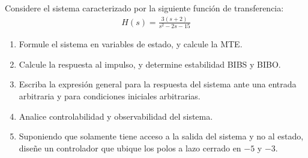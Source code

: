 \documentclass[
  11pt,
  letterpaper,
   addpoints,
  answers
  ]{exam}
\begin{document}
\begin{questions}
    \question Considere el sistema caracterizado por la siguiente función de transferencia:
    \begin{align}
    H(s) = \frac{3(s + 2)}{s^2 - 2s - 15}
    \end{align}
    \begin{enumerate}
        \item Formule el sistema en variables de estado, y calcule la MTE.
        \item Calcule la respuesta al impulso, y determine estabilidad BIBS y BIBO.
        \item Escriba la expresión general para la respuesta del sistema ante una entrada arbitraria y para condiciones iniciales arbitrarias.
        \item Analice controlabilidad y observabilidad del sistema.
        \item Suponiendo que solamente tiene acceso a la salida del sistema y no al estado, diseñe un controlador que ubique los polos a lazo cerrado en $-5$ y $-3$.
    \end{enumerate}
    \begin{solution}

\end{solution}
\end{questions}
\end{document}
